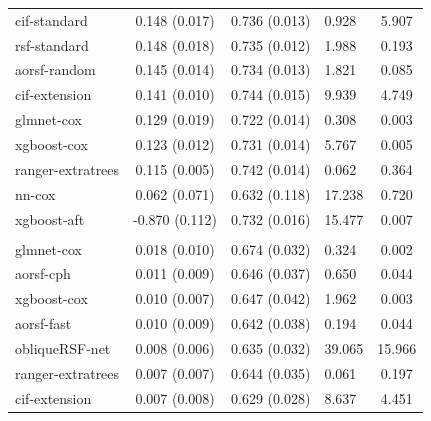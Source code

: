 \documentclass[twoside,11pt]{article}\usepackage[]{graphicx}\usepackage[]{xcolor}
\newenvironment{knitrout}{}{} %
\begin{document}
\begin{knitrout}
\begin{longtable}[t]{lcclc}
\hspace{1em}cif-standard & 0.148 (0.017) & 0.736 (0.013) & 0.928 & 5.907\\
\hspace{1em}rsf-standard & 0.148 (0.018) & 0.735 (0.012) & 1.988 & 0.193\\
\hspace{1em}aorsf-random & 0.145 (0.014) & 0.734 (0.013) & 1.821 & 0.085\\
\hspace{1em}cif-extension & 0.141 (0.010) & 0.744 (0.015) & 9.939 & 4.749\\
\hspace{1em}glmnet-cox & 0.129 (0.019) & 0.722 (0.014) & 0.308 & 0.003\\
\hspace{1em}xgboost-cox & 0.123 (0.012) & 0.731 (0.014) & 5.767 & 0.005\\
\hspace{1em}ranger-extratrees & 0.115 (0.005) & 0.742 (0.014) & 0.062 & 0.364\\
\hspace{1em}nn-cox & 0.062 (0.071) & 0.632 (0.118) & 17.238 & 0.720\\
\hspace{1em}xgboost-aft & -0.870 (0.112) & 0.732 (0.016) & 15.477 & 0.007\\
\addlinespace[0.3em]
\hline
\multicolumn{5}{l}{\textit{\textbf{Monoclonal gammopathy; malignancy, n = 1384, p = 8}}}\\
\hline
\hspace{1em}glmnet-cox & 0.018 (0.010) & 0.674 (0.032) & 0.324 & 0.002\\
\hspace{1em}aorsf-cph & 0.011 (0.009) & 0.646 (0.037) & 0.650 & 0.044\\
\hspace{1em}xgboost-cox & 0.010 (0.007) & 0.647 (0.042) & 1.962 & 0.003\\
\hspace{1em}aorsf-fast & 0.010 (0.009) & 0.642 (0.038) & 0.194 & 0.044\\
\hspace{1em}obliqueRSF-net & 0.008 (0.006) & 0.635 (0.032) & 39.065 & 15.966\\
\hspace{1em}ranger-extratrees & 0.007 (0.007) & 0.644 (0.035) & 0.061 & 0.197\\
\hspace{1em}cif-extension & 0.007 (0.008) & 0.629 (0.028) & 8.637 & 4.451\\

\end{longtable}
\end{knitrout}
\end{document}
